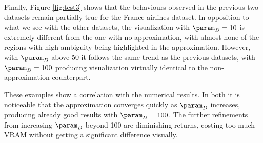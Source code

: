 Finally, Figure \ref{fig:test3} shows that the behaviours observed in the previous two datasets remain partially true for the France airlines dataset. In opposition to what we see with the other datasets, the visualization with $\param_D = 10$ is extremely different from the one with no approximation, with almost none of the regions with high ambiguity being highlighted in the approximation. However, with $\param_D$ above 50 it follows the same trend as the previous datasets, with $\param_D = 100$ producing visualization virtually identical to the non-approximation counterpart.

These examples show a correlation with the numerical results. In both it is noticeable that the approximation converges quickly as $\param_D$ increases, producing already good results with $\param_D = 100$. The further refinements from increasing $\param_D$ beyond 100 are diminishing returns, costing too much VRAM without getting a significant difference visually.
